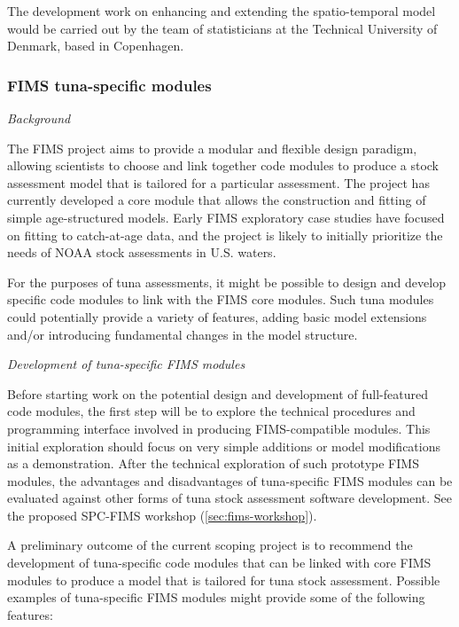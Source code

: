 \documentclass{SCreport}
\begin{document}
The development work on enhancing and extending the spatio-temporal model would
be carried out by the team of statisticians at the Technical University of
Denmark, based in Copenhagen.

\vspace{3ex}

\subsubsection{FIMS tuna-specific modules}
\label{sec:fims-development-project}

\textit{Background}

The FIMS project aims to provide a modular and flexible design paradigm,
allowing scientists to choose and link together code modules to produce a stock
assessment model that is tailored for a particular assessment. The project has
currently developed a core module that allows the construction and fitting of
simple age-structured models. Early FIMS exploratory case studies have focused
on fitting to catch-at-age data, and the project is likely to initially
prioritize the needs of NOAA stock assessments in U.S. waters.

For the purposes of tuna assessments, it might be possible to design and develop
specific code modules to link with the FIMS core modules. Such tuna modules
could potentially provide a variety of features, adding basic model extensions
and/or introducing fundamental changes in the model structure.

\vspace{2ex}

\textit{Development of tuna-specific FIMS modules}

Before starting work on the potential design and development of full-featured
code modules, the first step will be to explore the technical procedures and
programming interface involved in producing FIMS-compatible modules. This
initial exploration should focus on very simple additions or model modifications
as a demonstration. After the technical exploration of such prototype FIMS
modules, the advantages and disadvantages of tuna-specific FIMS modules can be
evaluated against other forms of tuna stock assessment software development. See
the proposed SPC-FIMS workshop (\autoref{sec:fims-workshop}).

A preliminary outcome of the current scoping project is to recommend the
development of tuna-specific code modules that can be linked with core FIMS
modules to produce a model that is tailored for tuna stock assessment. Possible
examples of tuna-specific FIMS modules might provide some of the following
features:
\end{document}
